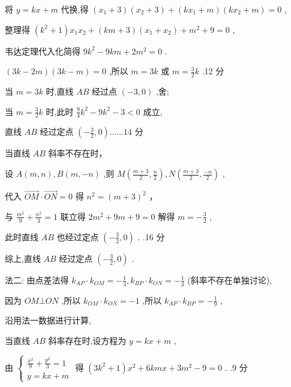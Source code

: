 \documentclass[10pt]{article}
\newcommand*\circled[1]{\tikz[baseline=(char.base)]{\node[shape=circle,draw,inner sep=1.5pt] (char) {\small #1};}}
\begin{document}
将 \(y = {kx} + m\) 代换,得 \(\left( {{x}_{1} + 3}\right) \left( {{x}_{2} + 3}\right)  + \left( {k{x}_{1} + m}\right) \left( {k{x}_{2} + m}\right)  = 0\) ,

整理得 \(\left( {{k}^{2} + 1}\right) {x}_{1}{x}_{2} + \left( {{km} + 3}\right) \left( {{x}_{1} + {x}_{2}}\right)  + {m}^{2} + 9 = 0\) ,

韦达定理代入化简得 \(9{k}^{2} - {9km} + 2{m}^{2} = 0\) .

\(\left( {{3k} - {2m}}\right) \left( {{3k} - m}\right)  = 0\) ,所以 \(m = {3k}\) 或 \(m = \frac{3}{2}k\) .12 分

当 \(m = {3k}\) 时,直线 \({AB}\) 经过点 \(\left( {-3,0}\right)\) ,舍;

当 \(m = \frac{3}{2}k\) 时,此时 \(\frac{9}{4}{k}^{2} - 9{k}^{2} - 3 < 0\) 成立,

直线 \({AB}\) 经过定点 \(\left( {-\frac{3}{2},0}\right) \ldots \ldots {14}\) 分

 \circled{2} 当直线 \({AB}\) 斜率不存在时，

设 \(A\left( {m,n}\right) ,B\left( {m, - n}\right)\) ,则 \(M\left( {\frac{m + 3}{2},\frac{n}{2}}\right) ,N\left( {\frac{m + 3}{2},\frac{-n}{2}}\right)\) ,

代入 \(\overrightarrow{OM} \cdot  \overrightarrow{ON} = 0\) 得 \({n}^{2} = {\left( m + 3\right) }^{2}\) ，

与 \(\frac{{m}^{2}}{9} + \frac{{n}^{2}}{3} = 1\) 联立得 \(2{m}^{2} + {9m} + 9 = 0\) 解得 \(m =  - \frac{3}{2}\) ,

此时直线 \({AB}\) 也经过定点 \(\left( {-\frac{3}{2},0}\right)\) . .16 分

综上,直线 \({AB}\) 经过定点 \(\left( {-\frac{3}{2},0}\right)\) .

法二: 由点差法得 \({k}_{AP} \cdot  {k}_{OM} =  - \frac{1}{3},{k}_{BP} \cdot  {k}_{ON} =  - \frac{1}{3}\) (斜率不存在单独讨论),

因为 \({OM} \bot  {ON}\) ,所以 \({k}_{OM} \cdot  {k}_{ON} =  - 1\) ,所以 \({k}_{AP} \cdot  {k}_{BP} =  - \frac{1}{9}\) ,

沿用法一数据进行计算,

 \circled{1}  当直线 \({AB}\) 斜率存在时,设方程为 \(y = {kx} + m\) ,

由 \(\left\{  \begin{array}{l} \frac{{x}^{2}}{9} + \frac{{y}^{2}}{3} = 1 \\  y = {kx} + m \end{array}\right.\) 得 \(\left( {3{k}^{2} + 1}\right) {x}^{2} + {6kmx} + 3{m}^{2} - 9 = 0\) . .9 分
\end{document}
